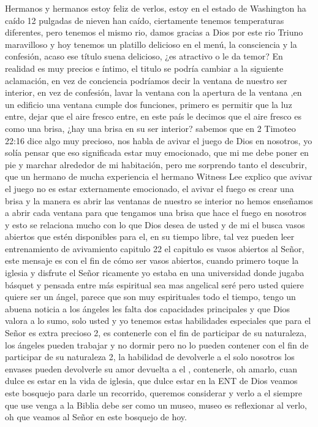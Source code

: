 \documentclass[12pt]{article}
\begin{document}
Hermanos y hermanos estoy feliz de verlos, estoy en el estado de Washington ha caído 12 pulgadas de nieven han caído, ciertamente tenemos temperaturas diferentes, pero tenemos el mismo rio, damos gracias a Dios por este rio Triuno maravilloso y hoy tenemos un platillo delicioso en el menú, la consciencia y la confesión, acaso ese título suena delicioso, ¿es atractivo o le da temor? En realidad es muy precios e íntimo, el titulo se podría cambiar a la siguiente aclamación, en vez de conciencia podríamos decir la ventana de nuestro ser interior, en vez de confesión, lavar la ventana con la apertura de la ventana ,en un edificio una ventana cumple dos funciones, primero es permitir  que la luz entre, dejar que el aire fresco entre, en este país le decimos que el aire fresco es como una brisa, ¿hay una brisa en su ser interior? sabemos que en 2 Timoteo 22:16 dice algo muy precioso, nos habla de avivar el juego de Dios en nosotros, yo solía pensar que eso significada estar muy emocionado, que mi me debe poner en pie y marchar alrededor de mi habitación, pero me sorprendo tanto el descubrir, que un hermano de mucha experiencia el hermano Witness Lee explico que avivar el juego no es estar externamente emocionado, el avivar el fuego es crear una brisa y la manera es abrir las ventanas de nuestro se interior no hemos enseñamos a abrir cada ventana para que tengamos una brisa que hace el fuego en nosotros y esto se relaciona mucho con lo que Dios desea de usted y de mi el busca vasos abiertos que estén disponibles para el, en su tiempo libre, tal vez pueden leer entrenamiento de avivamiento capitulo 22 el capitulo es vasos abiertos al Señor, este mensaje es con el fin de cómo ser vasos abiertos, cuando primero toque la iglesia y disfrute el Señor ricamente yo estaba en una universidad donde jugaba básquet y pensada entre más espiritual sea mas angelical seré pero usted quiere quiere ser un ángel, parece que son muy espirituales todo el tiempo, tengo un abuena noticia a los ángeles les falta dos capacidades principales y que Dios valora a lo sumo, solo usted y yo tenemos estas habilidades especiales que para el Señor es extra precioso 2, es contenerle con el fin de participar de su naturaleza, los ángeles pueden trabajar y no dormir pero no lo pueden contener con el fin de participar de su naturaleza 2, la habilidad de devolverle a el solo nosotros los envases pueden devolverle su amor devuelta a el , contenerle, oh amarlo, cuan dulce es estar en la vida de iglesia, que dulce estar en la ENT de Dios veamos este bosquejo para darle un recorrido, queremos considerar y verlo a el siempre que use venga a la Biblia debe ser como un museo, museo es reflexionar al verlo, oh que veamos al Señor en este bosquejo de hoy.\\
\end{document}
